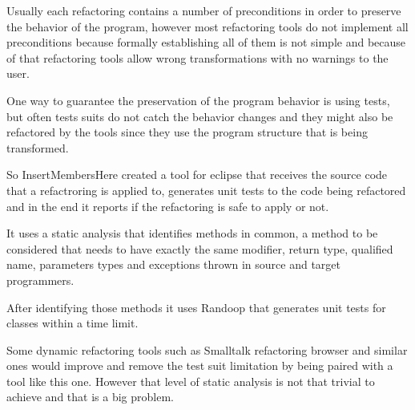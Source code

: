 Usually each refactoring contains a number of preconditions in order to preserve the behavior of the program, however most refactoring tools do not implement all preconditions because formally establishing all of them is not simple and because of that refactoring tools allow wrong transformations with no warnings to the user.

One way to guarantee the preservation of the program behavior is using tests, but often tests suits do not catch the behavior changes and they might also be refactored by the tools since they use the program structure that is being transformed.

So InsertMembersHere created a tool for eclipse that receives the source code that a refactroring is applied to, generates unit tests to the code being refactored and in the end it reports if the refactoring is safe to apply or not.

It uses a static analysis that identifies methods in common, a method to be considered that needs to have exactly the same modifier, return type, qualified name, parameters types and exceptions thrown in source and target programmers.

After identifying those methods it uses Randoop %
that generates unit tests for classes within a time limit.

Some dynamic refactoring tools such as Smalltalk refactoring browser and similar ones would improve and remove the test suit limitation by being paired with a tool like this one. However that level of static analysis is not that trivial to achieve and that is a big problem. %